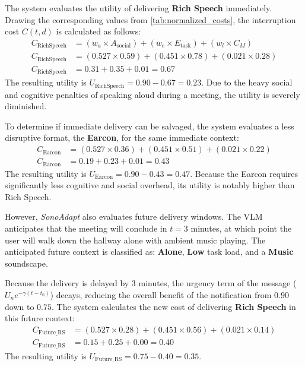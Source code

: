 The system evaluates the utility of delivering \textbf{Rich Speech} immediately. Drawing the corresponding values from \autoref{tab:normalized_costs}, the interruption cost $C(t,d)$ is calculated as follows:
\begin{align*}
C_{\mathrm{RichSpeech}} &= (w_a \times A_{\mathrm{social}}) + (w_e \times E_{\mathrm{task}}) + (w_l \times C_M) \\
C_{\mathrm{RichSpeech}} &= (0.527 \times 0.59) + (0.451 \times 0.78) + (0.021 \times 0.28) \\
C_{\mathrm{RichSpeech}} &= 0.31 + 0.35 + 0.01 = \mathbf{0.67}
\end{align*}
The resulting utility is $U_{\mathrm{RichSpeech}} = 0.90 - 0.67 = \mathbf{0.23}$. Due to the heavy social and cognitive penalties of speaking aloud during a meeting, the utility is severely diminished. 

To determine if immediate delivery can be salvaged, the system evaluates a less disruptive format, the \textbf{Earcon}, for the same immediate context:
\begin{align*}
C_{\mathrm{Earcon}} &= (0.527 \times 0.36) + (0.451 \times 0.51) + (0.021 \times 0.22) \\
C_{\mathrm{Earcon}} &= 0.19 + 0.23 + 0.01 = \mathbf{0.43}
\end{align*}
The resulting utility is $U_{\mathrm{Earcon}} = 0.90 - 0.43 = \mathbf{0.47}$. Because the Earcon requires significantly less cognitive and social overhead, its utility is notably higher than Rich Speech.

However, \textit{SonoAdapt} also evaluates future delivery windows. The VLM anticipates that the meeting will conclude in $t=3$ minutes, at which point the user will walk down the hallway alone with ambient music playing. The anticipated future context is classified as: \textbf{Alone}, \textbf{Low} task load, and a \textbf{Music} soundscape. 

Because the delivery is delayed by 3 minutes, the urgency term of the message ($U_n e^{-\gamma(t-t_0)}$) decays, reducing the overall benefit of the notification from $0.90$ down to $0.75$. The system calculates the new cost of delivering \textbf{Rich Speech} in this future context:
\begin{align*}
C_{\mathrm{Future\_RS}} &= (0.527 \times 0.28) + (0.451 \times 0.56) + (0.021 \times 0.14) \\
C_{\mathrm{Future\_RS}} &= 0.15 + 0.25 + 0.00 = \mathbf{0.40}
\end{align*}
The resulting utility is $U_{\mathrm{Future\_RS}} = 0.75 - 0.40 = \mathbf{0.35}$.

